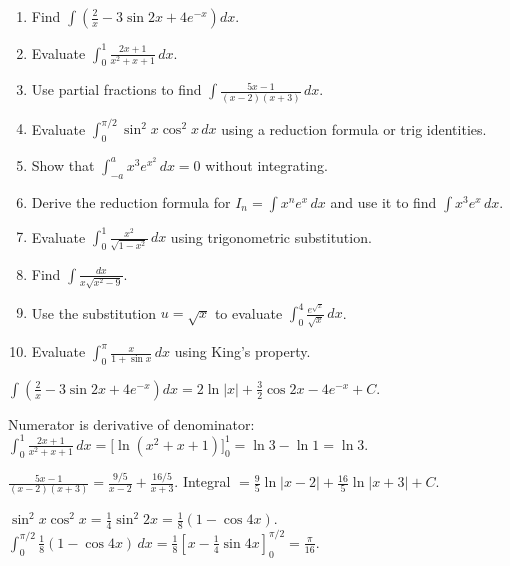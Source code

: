 \documentclass[11pt]{article}
\begin{document}
\begin{exercice}
\begin{enumerate}
    \item Find $\int \left( \frac{2}{x} - 3\sin 2x + 4e^{-x} \right) dx$.
    \item Evaluate $\int_0^1 \frac{2x+1}{x^2+x+1}\,dx$.
    \item Use partial fractions to find $\int \frac{5x-1}{(x-2)(x+3)}\,dx$.
    \item Evaluate $\int_0^{\pi/2} \sin^2 x \cos^2 x\,dx$ using a reduction formula or trig identities.
    \item Show that $\int_{-a}^a x^3 e^{x^2}\,dx = 0$ without integrating.
    \item Derive the reduction formula for $I_n = \int x^n e^x\,dx$ and use it to find $\int x^3 e^x\,dx$.
    \item Evaluate $\int_0^1 \frac{x^2}{\sqrt{1-x^2}}\,dx$ using trigonometric substitution.
    \item Find $\int \frac{dx}{x\sqrt{x^2-9}}$.
    \item Use the substitution $u = \sqrt{x}$ to evaluate $\int_0^4 \frac{e^{\sqrt{x}}}{\sqrt{x}}\,dx$.
    \item Evaluate $\int_0^{\pi} \frac{x}{1+\sin x}\,dx$ using King's property.
\end{enumerate}
\end{exercice}

\begin{corrige}[Exercise 1]
$\int \left( \frac{2}{x} - 3\sin 2x + 4e^{-x} \right) dx = 2\ln|x| + \frac{3}{2}\cos 2x - 4e^{-x} + C$.
\end{corrige}

\begin{corrige}[Exercise 2]
Numerator is derivative of denominator: $\int_0^1 \frac{2x+1}{x^2+x+1}\,dx = \Big[\ln(x^2+x+1)\Big]_0^1 = \ln 3 - \ln 1 = \ln 3$.
\end{corrige}

\begin{corrige}[Exercise 3]
$\frac{5x-1}{(x-2)(x+3)} = \frac{9/5}{x-2} + \frac{16/5}{x+3}$. Integral $= \frac{9}{5}\ln|x-2| + \frac{16}{5}\ln|x+3| + C$.
\end{corrige}

\begin{corrige}[Exercise 4]
$\sin^2 x \cos^2 x = \frac{1}{4}\sin^2 2x = \frac{1}{8}(1-\cos 4x)$. $\int_0^{\pi/2} \frac{1}{8}(1-\cos 4x)\,dx = \frac{1}{8}\left[ x - \frac{1}{4}\sin 4x \right]_0^{\pi/2} = \frac{\pi}{16}$.
\end{corrige}
\end{document}
